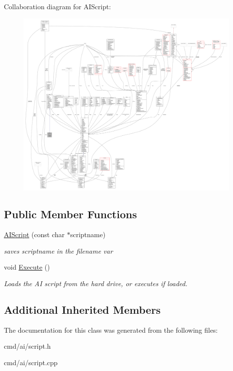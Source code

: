 Collaboration diagram for A\+I\+Script\+:
\nopagebreak
\begin{figure}[H]
\begin{center}
\leavevmode
\includegraphics[width=350pt]{d6/de5/classAIScript__coll__graph}
\end{center}
\end{figure}
\subsection*{Public Member Functions}
\begin{DoxyCompactItemize}
\item 
\hyperlink{classAIScript_a6373b771d00a87afbfbf8a62111ba295}{A\+I\+Script} (const char $\ast$scriptname)\hypertarget{classAIScript_a6373b771d00a87afbfbf8a62111ba295}{}\label{classAIScript_a6373b771d00a87afbfbf8a62111ba295}

\begin{DoxyCompactList}\small\item\em saves scriptname in the filename var \end{DoxyCompactList}\item 
void \hyperlink{classAIScript_a1eab791c0cd8505ef33dc4a92d8824fc}{Execute} ()\hypertarget{classAIScript_a1eab791c0cd8505ef33dc4a92d8824fc}{}\label{classAIScript_a1eab791c0cd8505ef33dc4a92d8824fc}

\begin{DoxyCompactList}\small\item\em Loads the AI script from the hard drive, or executes if loaded. \end{DoxyCompactList}\end{DoxyCompactItemize}
\subsection*{Additional Inherited Members}


The documentation for this class was generated from the following files\+:\begin{DoxyCompactItemize}
\item 
cmd/ai/script.\+h\item 
cmd/ai/script.\+cpp\end{DoxyCompactItemize}
